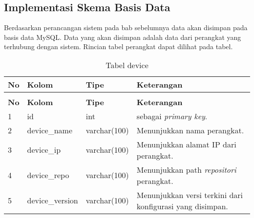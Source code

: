    	\subsection{Implementasi Skema Basis Data}
   	Berdasarkan perancangan sistem pada bab sebelumnya data akan disimpan pada basis data MySQL. Data yang akan disimpan adalah data dari perangkat yang terhubung dengan sistem. Rincian tabel perangkat dapat dilihat pada tabel.
   	\begin{longtable}{|p{}|p{}|p{}|p{}|}
   		
   		\caption{Tabel device} \label{tabeldevice} \\
   		\hline
   		\textbf{No} & \textbf{Kolom} & \textbf{Tipe} & \textbf{Keterangan} \\ \hline
   		\endfirsthead
   		\caption[]{Tabel device}   \\
   		\hline
   		\textbf{No} & \textbf{Kolom} & \textbf{Tipe} & \textbf{Keterangan} \\ \hline
   		\endhead
   		\endfoot
   		\endlastfoot
   		
   		1 & id & int & sebagai \textit{primary key}. \\ \hline
   		2 & device\_name & varchar(100) & Menunjukkan nama perangkat. \\ \hline
   		3 & device\_ip & varchar(100) & Menunjukkan alamat IP dari perangkat.\\ \hline	
   		4 & device\_repo & varchar(100) & Menunjukkan path \textit{repositori} perangkat.\\ \hline
   		5 & device\_version & varchar(100) & Menunjukkan versi terkini dari konfigurasi yang disimpan. \\ \hline
   		
   	\end{longtable}
   		